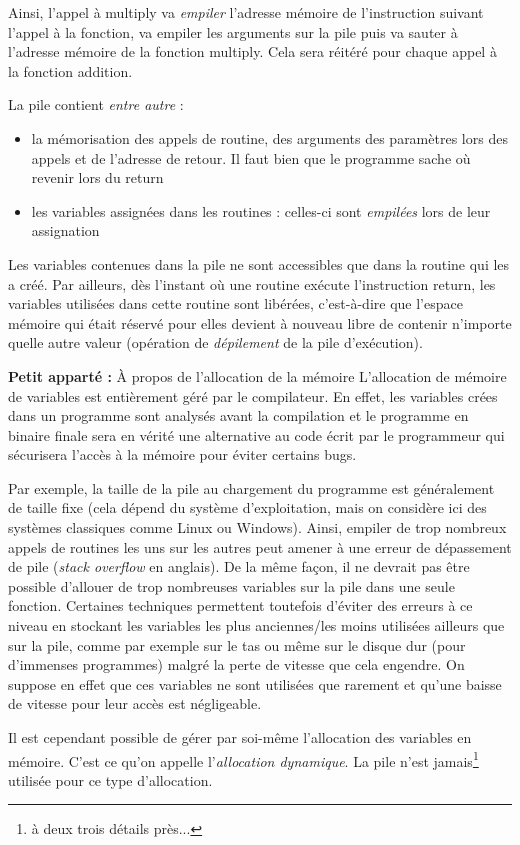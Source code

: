 \documentclass[../../../main.tex]{subfiles}
\begin{document}
Ainsi, l'appel à \textsf{multiply} va \textit{empiler} l'adresse mémoire de l'instruction suivant l'appel à la fonction, va empiler les arguments sur la pile puis va sauter à l'adresse mémoire de la fonction \textsf{multiply}. Cela sera réitéré pour chaque appel à la fonction \textsf{addition}.
 
La pile contient \textit{entre autre} :
\begin{itemize}
	\item la mémorisation des appels de routine, des arguments des paramètres lors des appels et de l'adresse de retour. Il faut bien que le programme sache où revenir lors du \textsf{return}
	\item les variables assignées dans les routines : celles-ci sont \textit{empilées} lors de leur assignation
\end{itemize}
Les variables contenues dans la pile ne sont accessibles que dans la routine qui les a créé. Par ailleurs, dès l'instant où une routine exécute l'instruction \textsf{return}, les variables utilisées dans cette routine sont libérées, c'est-à-dire que l'espace mémoire qui était réservé pour elles devient à nouveau libre de contenir n'importe quelle autre valeur (opération de \textit{dépilement} de la pile d'exécution).

\begin{minitelbasicbox}{\textbf{Petit apparté :} À propos de l'allocation de la mémoire}
	L'allocation de mémoire de variables est entièrement géré par le compilateur. En effet, les variables crées dans un programme sont analysés avant la compilation et le programme en binaire finale sera en vérité une alternative au code écrit par le programmeur qui sécurisera l'accès à la mémoire pour éviter certains bugs.
 
	Par exemple, la taille de la pile au chargement du programme est généralement de taille fixe (cela dépend du système d'exploitation, mais on considère ici des systèmes classiques comme Linux ou Windows). Ainsi, empiler de trop nombreux appels de routines les uns sur les autres peut amener à une erreur de dépassement de pile (\textit{stack overflow} en anglais). De la même façon, il ne devrait pas être possible d'allouer de trop nombreuses variables sur la pile dans une seule fonction. Certaines techniques permettent toutefois d'éviter des erreurs à ce niveau en stockant les variables les plus anciennes/les moins utilisées ailleurs que sur la pile, comme par exemple sur le tas ou même sur le disque dur (pour d'immenses programmes) malgré la perte de vitesse que cela engendre. On suppose en effet que ces variables ne sont utilisées que rarement et qu'une baisse de vitesse pour leur accès est négligeable.

	Il est cependant possible de gérer par soi-même l'allocation des variables en mémoire. C'est ce qu'on appelle l'\textit{allocation dynamique}. La pile n'est jamais\footnote{à deux trois détails près...} utilisée pour ce type d'allocation.
\end{minitelbasicbox}
\end{document}

